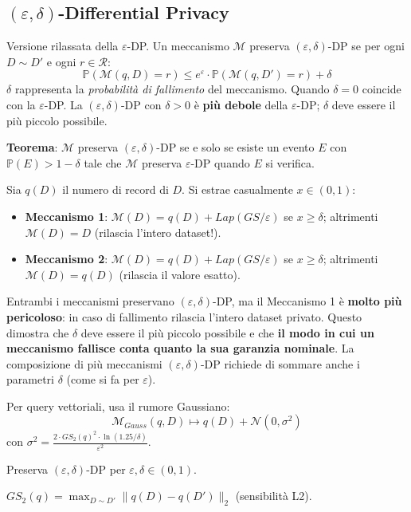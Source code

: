 \documentclass[a4paper,11pt]{article}
\begin{document}
\subsection{$(\varepsilon, \delta)$-Differential Privacy}

\begin{definizione}
Versione rilassata della $\varepsilon$-DP. Un meccanismo $\mathcal{M}$ preserva $(\varepsilon, \delta)$-DP se per ogni $D \sim D'$ e ogni $r \in \mathcal{R}$:
\[
\mathbb{P}(\mathcal{M}(q, D) = r) \leq e^{\varepsilon} \cdot \mathbb{P}(\mathcal{M}(q, D') = r) + \delta
\]
$\delta$ rappresenta la \emph{probabilit\`{a} di fallimento} del meccanismo. Quando $\delta = 0$ coincide con la $\varepsilon$-DP. La $(\varepsilon, \delta)$-DP con $\delta > 0$ \`{e} \textbf{pi\`{u} debole} della $\varepsilon$-DP; $\delta$ deve essere il pi\`{u} piccolo possibile.

\textbf{Teorema}: $\mathcal{M}$ preserva $(\varepsilon, \delta)$-DP se e solo se esiste un evento $E$ con $\mathbb{P}(E) > 1 - \delta$ tale che $\mathcal{M}$ preserva $\varepsilon$-DP quando $E$ si verifica.
\end{definizione}

\begin{esempio}
Sia $q(D)$ il numero di record di $D$. Si estrae casualmente $x \in (0,1)$:
\begin{itemize}
  \item \textbf{Meccanismo 1}: $\mathcal{M}(D) = q(D) + Lap(GS/\varepsilon)$ se $x \geq \delta$; altrimenti $\mathcal{M}(D) = D$ (rilascia l'intero dataset!).
  \item \textbf{Meccanismo 2}: $\mathcal{M}(D) = q(D) + Lap(GS/\varepsilon)$ se $x \geq \delta$; altrimenti $\mathcal{M}(D) = q(D)$ (rilascia il valore esatto).
\end{itemize}
Entrambi i meccanismi preservano $(\varepsilon, \delta)$-DP, ma il Meccanismo 1 \`{e} \textbf{molto pi\`{u} pericoloso}: in caso di fallimento rilascia l'intero dataset privato. Questo dimostra che $\delta$ deve essere il pi\`{u} piccolo possibile e che \textbf{il modo in cui un meccanismo fallisce conta quanto la sua garanzia nominale}. La composizione di pi\`{u} meccanismi $(\varepsilon, \delta)$-DP richiede di sommare anche i parametri $\delta$ (come si fa per $\varepsilon$).
\end{esempio}

\begin{teorema}
Per query vettoriali, usa il rumore Gaussiano:
\[
\mathcal{M}_{Gauss}(q, D) \mapsto q(D) + \mathcal{N}(0, \sigma^2)
\]
con $\sigma^2 = \frac{2 \cdot GS_2(q)^2 \cdot \ln(1.25/\delta)}{\varepsilon^2}$.

Preserva $(\varepsilon, \delta)$-DP per $\varepsilon, \delta \in (0, 1)$.

$GS_2(q) = \max_{D \sim D'} \|q(D) - q(D')\|_2$ (sensibilit\`{a} L2).
\end{teorema}
\end{document}
